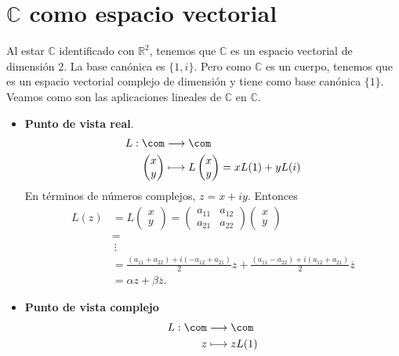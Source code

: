 \section{$\mathbb{C}$ como espacio vectorial}
Al estar $\mathbb{C}$ identificado con $\mathbb{R}^2$, tenemos que $\mathbb{C}$ es un espacio vectorial de dimensión 2. La base canónica es $\{1,i\}$. Pero como $\mathbb{C}$ es un cuerpo, tenemos que es un espacio vectorial complejo de dimensión y tiene como base canónica $\{1\}$.
\\
\newline
Veamos como son las aplicaciones lineales de $\mathbb{C}$ en $\mathbb{C}$.
\begin{itemize}
    \item \textbf{Punto de vista real}.
    \begin{align*}
        L : \com &\longrightarrow \com \\
        \begin{pmatrix}
            x \\
            y 
        \end{pmatrix} &\longmapsto L\begin{pmatrix}
            x \\
            y 
        \end{pmatrix} = xL(1) + yL(i)
    \end{align*}
    En términos de números complejos, $z = x + iy$. Entonces
    \begin{align*}
        L(z) &= L \begin{pmatrix}
            x \\
            y 
        \end{pmatrix} = \begin{pmatrix}
            a_{11} & a_{12} \\
            a_{21} & a_{22} 
        \end{pmatrix} \begin{pmatrix}
            x \\
            y 
        \end{pmatrix} \\
        &= \\
        & \ \vdots \\
        &= \frac{(a_{11} + a_{22}) + i(-a_{12} + a_{21})}{2}z + \frac{(a_{11} - a_{22}) +i(a_{12} + a_{21})}{2}\overline{z} \\
        & = \alpha z + \beta \overline{z}.
    \end{align*}
    \item \textbf{Punto de vista complejo}
    \begin{align*}
         L : \com &\longrightarrow \com \\
         z &\longmapsto zL(1)
    \end{align*}
\end{itemize}

